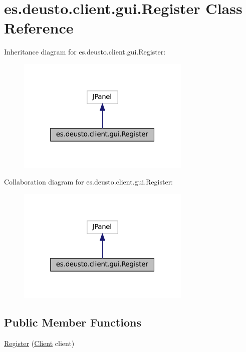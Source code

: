 \hypertarget{classes_1_1deusto_1_1client_1_1gui_1_1_register}{}\section{es.\+deusto.\+client.\+gui.\+Register Class Reference}
\label{classes_1_1deusto_1_1client_1_1gui_1_1_register}


Inheritance diagram for es.\+deusto.\+client.\+gui.\+Register\+:\nopagebreak
\begin{figure}[H]
\begin{center}
\leavevmode
\includegraphics[width=235pt]{classes_1_1deusto_1_1client_1_1gui_1_1_register__inherit__graph}
\end{center}
\end{figure}


Collaboration diagram for es.\+deusto.\+client.\+gui.\+Register\+:\nopagebreak
\begin{figure}[H]
\begin{center}
\leavevmode
\includegraphics[width=235pt]{classes_1_1deusto_1_1client_1_1gui_1_1_register__coll__graph}
\end{center}
\end{figure}
\subsection*{Public Member Functions}
\begin{DoxyCompactItemize}
\item 
\mbox{\hyperlink{classes_1_1deusto_1_1client_1_1gui_1_1_register_a5b463722d846413a2b1e929207c0f20d}{Register}} (\mbox{\hyperlink{classes_1_1deusto_1_1client_1_1_client}{Client}} client)
\end{DoxyCompactItemize}


